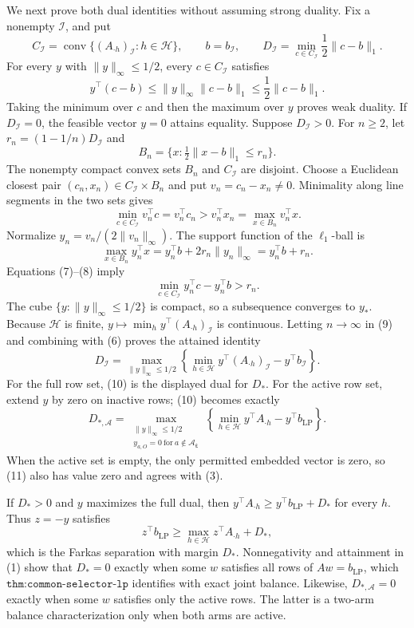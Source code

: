We next prove both dual identities without assuming strong duality. Fix a nonempty \(\mathcal I\), and put
\[
C_{\mathcal I}=\operatorname{conv}\{(A_{\cdot h})_{\mathcal I}:h\in\mathcal H\},\qquad b=b_{\mathcal I},\qquad D_{\mathcal I}=\min_{c\in C_{\mathcal I}}\frac12\lVert c-b\rVert_1.
\tag{5}
\]
For every \(y\) with \(\lVert y\rVert_\infty\le1/2\), every \(c\in C_{\mathcal I}\) satisfies
\[
y^\top(c-b)\le\lVert y\rVert_\infty\lVert c-b\rVert_1\le\frac12\lVert c-b\rVert_1.
\tag{6}
\]
Taking the minimum over \(c\) and then the maximum over \(y\) proves weak duality. If \(D_{\mathcal I}=0\), the feasible vector \(y=0\) attains equality. Suppose \(D_{\mathcal I}>0\). For \(n\ge2\), let \(r_n=(1-1/n)D_{\mathcal I}\) and
\[
B_n=\{x:\tfrac12\lVert x-b\rVert_1\le r_n\}.
\]
The nonempty compact convex sets \(B_n\) and \(C_{\mathcal I}\) are disjoint. Choose a Euclidean closest pair \((c_n,x_n)\in C_{\mathcal I}\times B_n\) and put \(v_n=c_n-x_n\ne0\). Minimality along line segments in the two sets gives
\[
\min_{c\in C_{\mathcal I}}v_n^\top c=v_n^\top c_n>v_n^\top x_n=\max_{x\in B_n}v_n^\top x.
\tag{7}
\]
Normalize \(y_n=v_n/(2\lVert v_n\rVert_\infty)\). The support function of the \(\ell_1\)-ball is
\[
\max_{x\in B_n}y_n^\top x=y_n^\top b+2r_n\lVert y_n\rVert_\infty=y_n^\top b+r_n.
\tag{8}
\]
Equations (7)--(8) imply
\[
\min_{c\in C_{\mathcal I}}y_n^\top c-y_n^\top b>r_n.
\tag{9}
\]
The cube \(\{y:\lVert y\rVert_\infty\le1/2\}\) is compact, so a subsequence converges to \(y_*\). Because \(\mathcal H\) is finite, \(y\mapsto\min_h y^\top(A_{\cdot h})_{\mathcal I}\) is continuous. Letting \(n\to\infty\) in (9) and combining with (6) proves the attained identity
\[
D_{\mathcal I}=\max_{\lVert y\rVert_\infty\le1/2}
\left\{\min_{h\in\mathcal H}y^\top(A_{\cdot h})_{\mathcal I}-y^\top b_{\mathcal I}\right\}.
\tag{10}
\]
For the full row set, (10) is the displayed dual for \(D_*\). For the active row set, extend \(y\) by zero on inactive rows; (10) becomes exactly
\[
D_{*,\mathcal A}=\max_{\substack{\lVert y\rVert_\infty\le1/2\\y_{a,O}=0\ \mathrm{for}\ a\notin\mathcal A_{\boldsymbol\varepsilon}}}
\left\{\min_{h\in\mathcal H}y^\top A_{\cdot h}-y^\top b_{\mathrm{LP}}\right\}.
\tag{11}
\]
When the active set is empty, the only permitted embedded vector is zero, so (11) also has value zero and agrees with (3).

If \(D_*>0\) and \(y\) maximizes the full dual, then \(y^\top A_{\cdot h}\ge y^\top b_{\mathrm{LP}}+D_*\) for every \(h\). Thus \(z=-y\) satisfies
\[
z^\top b_{\mathrm{LP}}\ge\max_{h\in\mathcal H}z^\top A_{\cdot h}+D_*,
\tag{12}
\]
which is the Farkas separation with margin \(D_*\). Nonnegativity and attainment in (1) show that \(D_*=0\) exactly when some \(w\) satisfies all rows of \(Aw=b_{\mathrm{LP}}\), which \(\texttt{thm:common-selector-lp}\) identifies with exact joint balance. Likewise, \(D_{*,\mathcal A}=0\) exactly when some \(w\) satisfies only the active rows. The latter is a two-arm balance characterization only when both arms are active.

